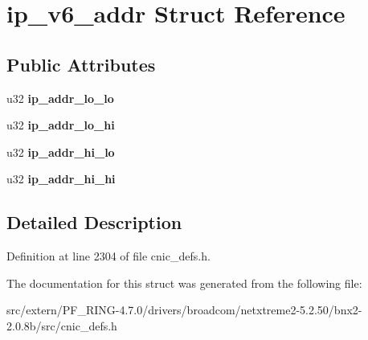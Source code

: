 \hypertarget{structip__v6__addr}{
\section{ip\_\-v6\_\-addr Struct Reference}
\label{structip__v6__addr}
}
\subsection*{Public Attributes}
\begin{DoxyCompactItemize}
\item 
\hypertarget{structip__v6__addr_abf599b22e93d2fd15eabb9ff32eb333c}{
u32 {\bfseries ip\_\-addr\_\-lo\_\-lo}}
\label{structip__v6__addr_abf599b22e93d2fd15eabb9ff32eb333c}

\item 
\hypertarget{structip__v6__addr_acacf5a7b6ce635b72d11b43f54805709}{
u32 {\bfseries ip\_\-addr\_\-lo\_\-hi}}
\label{structip__v6__addr_acacf5a7b6ce635b72d11b43f54805709}

\item 
\hypertarget{structip__v6__addr_a035d849d0fbb5d787672564ca5a03bc6}{
u32 {\bfseries ip\_\-addr\_\-hi\_\-lo}}
\label{structip__v6__addr_a035d849d0fbb5d787672564ca5a03bc6}

\item 
\hypertarget{structip__v6__addr_ab413ee14d2e94744d6b23e166b03245d}{
u32 {\bfseries ip\_\-addr\_\-hi\_\-hi}}
\label{structip__v6__addr_ab413ee14d2e94744d6b23e166b03245d}

\end{DoxyCompactItemize}


\subsection{Detailed Description}


Definition at line 2304 of file cnic\_\-defs.h.



The documentation for this struct was generated from the following file:\begin{DoxyCompactItemize}
\item 
src/extern/PF\_\-RING-\/4.7.0/drivers/broadcom/netxtreme2-\/5.2.50/bnx2-\/2.0.8b/src/cnic\_\-defs.h\end{DoxyCompactItemize}
